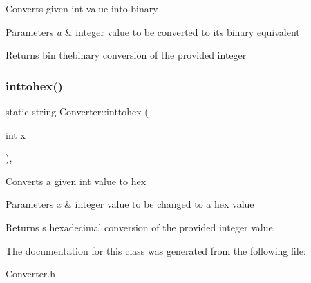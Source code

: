 Converts given int value into binary 
\begin{DoxyParams}{Parameters}
{\em a} & integer value to be converted to it\textquotesingle{}s binary equivalent \\
\hline
\end{DoxyParams}
\begin{DoxyReturn}{Returns}
bin thebinary conversion of the provided integer 
\end{DoxyReturn}
\mbox{\label{class_converter_a02f64183ea19c2d2671252cadb17f66f}} 
\subsubsection{\texorpdfstring{inttohex()}{inttohex()}}
{\footnotesize\ttfamily static string Converter\+::inttohex (\begin{DoxyParamCaption}\item[{int}]{x }\end{DoxyParamCaption})\hspace{0.3cm}{\ttfamily [inline]}, {\ttfamily [static]}}

Converts a given int value to hex 
\begin{DoxyParams}{Parameters}
{\em x} & integer value to be changed to a hex value \\
\hline
\end{DoxyParams}
\begin{DoxyReturn}{Returns}
s hexadecimal conversion of the provided integer value 
\end{DoxyReturn}


The documentation for this class was generated from the following file\+:\begin{DoxyCompactItemize}
\item 
Converter.\+h\end{DoxyCompactItemize}
